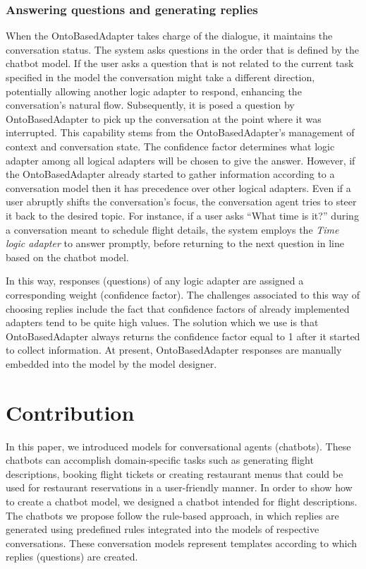 \documentclass[runningheads]{llncs}
\begin{document}
\subsubsection{Answering questions and generating replies}
When the OntoBasedAdapter takes charge of the dialogue, it maintains the conversation status. The system asks questions in the order that is defined by the chatbot model. If the user asks a question that is not related to the current task specified in the model the conversation might take a different direction, potentially allowing another logic adapter to respond, enhancing the conversation's natural flow. Subsequently, it is posed a question by OntoBasedAdapter to pick up the conversation at the point where it was interrupted. This capability stems from the OntoBasedAdapter's management of context and conversation state.    
The confidence factor determines what logic adapter among all logical adapters will be chosen to give the answer. However, if the OntoBasedAdapter already started to gather information according to a conversation model then it has precedence over other logical adapters. Even if a user abruptly shifts the conversation's focus, the conversation agent tries to steer it back to the desired topic. For instance, if a user asks ``What time is it?'' during a conversation meant to schedule flight details, the system employs the \textit{Time logic adapter} to answer promptly, before returning to the next question in line based on the chatbot model. 

In this way, responses (questions) of any logic adapter are assigned a corresponding weight (confidence factor). The challenges associated to this way of choosing replies include the fact that confidence factors of already implemented adapters tend to be quite high values. The solution which we use is that OntoBasedAdapter always returns the confidence factor equal to 1 after it started to collect information. At present, OntoBasedAdapter responses are manually embedded into the model by the model designer.

\section{Contribution}
In this paper, we introduced models for conversational agents (chatbots). These chatbots can accomplish domain-specific tasks such as generating flight descriptions, booking flight tickets or creating restaurant menus that could be used for restaurant reservations in a user-friendly manner.  
In order to show how to create a chatbot model, we designed a chatbot intended for flight descriptions. 
The chatbots we propose follow the rule-based approach, in which replies are generated using predefined rules integrated into the models of respective conversations. These conversation models represent templates according to which replies (questions) are created.
\end{document}

